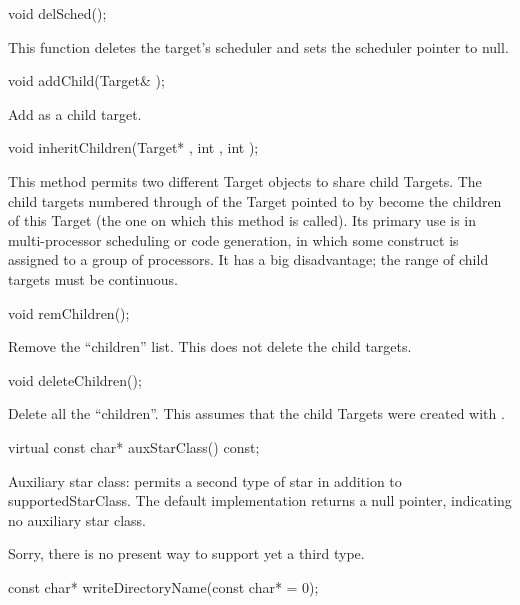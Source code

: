 \begin{example}
void delSched();
\end{example}

This function deletes the target's scheduler and sets the scheduler
pointer to null.

\begin{example}
void addChild(Target& );
\end{example}

Add  as a child target.

\begin{example}
void inheritChildren(Target* , int , int );
\end{example}

This method permits two different Target objects to share child Targets.
The child targets numbered  through  of the Target
pointed to by  become the children of this Target (the one
on which this method is called).  Its primary use is in multi-processor
scheduling or code generation, in which some construct is assigned to
a group of processors.  It has a big disadvantage; the range of child
targets must be continuous.

\begin{example}
void remChildren();
\end{example}

Remove the ``children'' list.  This does not delete the child targets.

\begin{example}
void deleteChildren();
\end{example}

Delete all the ``children''.  This assumes that the child Targets
were created with .

\begin{example}
virtual const char* auxStarClass() const;
\end{example}

Auxiliary star class: permits a second type of star in addition
to supportedStarClass.  The default implementation returns a
null pointer, indicating no auxiliary star class.

Sorry, there is no present way to support yet a third type.

\begin{example}
const char* writeDirectoryName(const char*  = 0);
\end{example}

